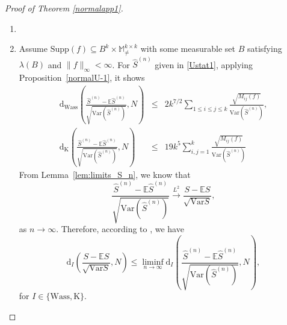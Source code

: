 \documentclass{article}
\theoremstyle{definition}
\numberwithin{equation}{section}
\theoremstyle{remark}
\newcommand{\E}{\mathbb{E}}
\newcommand{\Var}{\mathrm{Var}}
\newcommand{\supp}{\mathrm{Supp}}
\begin{document}
\begin{proof}[Proof of Theorem \ref{normalapp1}]

\begin{enumerate}
\item[]
\item[1)] Assume $\supp(f)\subseteq B^k\times\mathbb{M}^{k\times k}_{\ne}$ with some measurable set $B$ satisfying $\lambda(B)$ and $\|f\|_{\infty}<\infty$. 
For $\widehat{S}^{(n)}$ given in \eqref{Ustat1}, applying Proposition~\ref{normalU-1}, it shows 
\begin{eqnarray}
	\mathrm{d}_{\mathrm{Wass}}\left(\frac{\widehat{S}^{(n)}-\E \widehat{S}^{(n)}}{\sqrt{\Var (\widehat{S}^{(n)})}},N\right)&\le&2k^{7/2}\sum_{1\le i\le j\le k}\frac{\sqrt{M_{ij}(f)}}{\Var (\widehat{S}^{(n)})},\\
	\mathrm{d}_{\mathrm{K}}\left(\frac{\widehat{S}^{(n)}-\E \widehat{S}^{(n)}}{\sqrt{\Var (\widehat{S}^{(n)})}},N\right)&\le&19k^5\sum_{i,j=1}^k\frac{\sqrt{M_{ij}(f)}}{\Var (\widehat{S}^{(n)})}
\end{eqnarray}
From Lemma~\ref{lem:limits_S_n}, we know that
\begin{equation}
\frac{\widehat{S}^{(n)}-\E \widehat{S}^{(n)}}{\sqrt{\Var (\widehat{S}^{(n)})}}\overset{L^2}{\longrightarrow}\frac{S-\E S}{\sqrt{\Var S}},
\end{equation}as $n\to\infty$.
Therefore, according to \cite[Lemma~6.2]{Last_Nestmann_Schulte}, we have
\begin{equation}
	\mathrm{d}_I\left(\frac{S-\E S}{\sqrt{\Var S}},N\right)\le\liminf_{n\to\infty}\mathrm{d}_I\left(\frac{\widehat{S}^{(n)}-\E \widehat{S}^{(n)}}{\sqrt{\Var (\widehat{S}^{(n)})}},N\right),
\end{equation}
for $I\in\{\mathrm{Wass, K}\}$.


\end{enumerate}
\end{proof}
\end{document}

